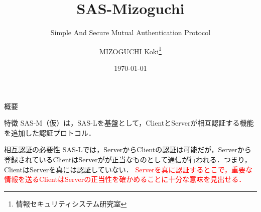 \documentclass[t,aspectratio=169,12pt]{beamer}
\title[SAS-M]{SAS-M{\tiny izoguchi}}
\subtitle{Simple And Secure Mutual Authentication Protocol}
\author[K.MIZOGUCHI]{MIZOGUCHI Koki\thanks{情報セキュリティシステム研究室}}
\date{\today}
\institute[KUT]{Kochi University of Technology}
\begin{document}
\begin{frame}
    \titlepage
\end{frame}
\begin{frame}{概要}
    \begin{block}{特徴}
        SAS-M（仮）は，SAS-Lを基盤として，{\ttfamily Client}と{\ttfamily Server}が相互認証する機能を追加した認証プロトコル．
    \end{block}
    \begin{block}{相互認証の必要性}
        SAS-Lでは，{\ttfamily Server}から{\ttfamily Client}の認証は可能だが，{\ttfamily Server}から登録されている{\ttfamily Client}は{\ttfamily Server}がが正当なものとして通信が行われる．つまり，{\ttfamily Client}は{\ttfamily Server}を真には認証していない．
        \textcolor{red}{{\ttfamily Server}を真に認証するとこで，重要な情報を送る{\ttfamily Client}は{\ttfamily Server}の正当性を確かめることに十分な意味を見出せる．}
    \end{block}
\end{frame}
\end{document}
